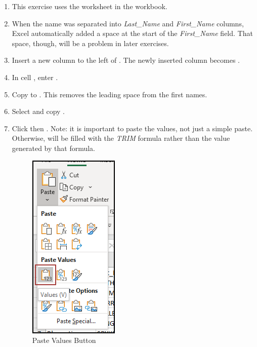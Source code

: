 \begin{enumbox}
	\begin{enumerate}
		\item This exercise uses the  worksheet in the  workbook.
		\item When the name was separated into \textit{Last\_Name} and \textit{First\_Name} columns, Excel automatically added a space at the start of the \textit{First\_Name} field. That space, though, will be a problem in later exercises. 
		\item Insert a new column to the left of . The newly inserted column becomes .
		\item In cell , enter .
		\item Copy  to . This removes the leading space from the first names.
		\item Select and copy .
		\item Click  then . Note: it is important to paste the values, not just a simple paste. Otherwise,  will be filled with the \textit{TRIM} formula rather than the value generated by that formula.
		
		\begin{figure}[H]
			\centering
			\includegraphics[width=\maxwidth{.50\linewidth}]{gfx/ch09_fig34}
			\caption{Paste Values Button}
			\label{09:fig34}
		\end{figure}
		

\end{enumerate}
\end{enumbox}
